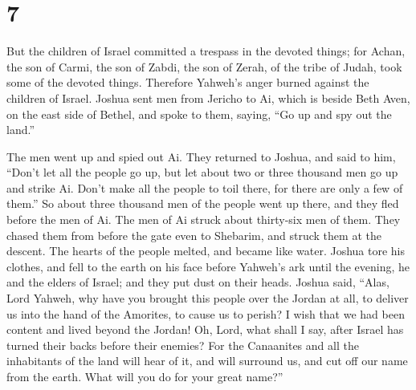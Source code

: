 \hypertarget{section-6}{%
\section{7}\label{section-6}}

 But the children of Israel committed a trespass in the
devoted things; for Achan, the son of Carmi, the son of Zabdi, the son
of Zerah, of the tribe of Judah, took some of the devoted things.
Therefore Yahweh's anger burned against the children of Israel.
 Joshua sent men from Jericho to Ai, which is beside Beth
Aven, on the east side of Bethel, and spoke to them, saying, ``Go up and
spy out the land.''

The men went up and spied out Ai.  They returned to Joshua,
and said to him, ``Don't let all the people go up, but let about two or
three thousand men go up and strike Ai. Don't make all the people to
toil there, for there are only a few of them.''  So about
three thousand men of the people went up there, and they fled before the
men of Ai.  The men of Ai struck about thirty-six men of
them. They chased them from before the gate even to Shebarim, and struck
them at the descent. The hearts of the people melted, and became like
water.  Joshua tore his clothes, and fell to the earth on
his face before Yahweh's ark until the evening, he and the elders of
Israel; and they put dust on their heads.  Joshua said,
``Alas, Lord Yahweh, why have you brought this people over the Jordan at
all, to deliver us into the hand of the Amorites, to cause us to perish?
I wish that we had been content and lived beyond the Jordan!
 Oh, Lord, what shall I say, after Israel has turned their
backs before their enemies?  For the Canaanites and all the
inhabitants of the land will hear of it, and will surround us, and cut
off our name from the earth. What will you do for your great name?''

